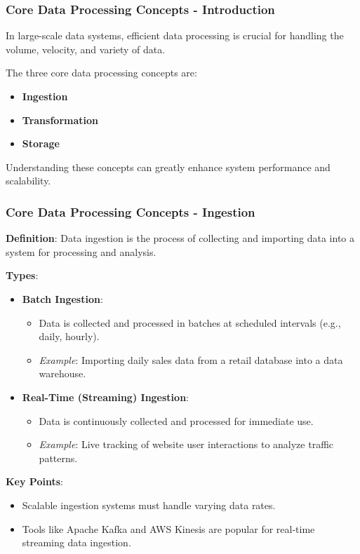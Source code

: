 \documentclass[aspectratio=169]{beamer}
\begin{document}
\begin{frame}[fragile]
    \frametitle{Core Data Processing Concepts - Introduction}
    In large-scale data systems, efficient data processing is crucial for handling the volume, velocity, and variety of data. 
    
    The three core data processing concepts are:
    \begin{itemize}
        \item \textbf{Ingestion}
        \item \textbf{Transformation}
        \item \textbf{Storage}
    \end{itemize}
    
    Understanding these concepts can greatly enhance system performance and scalability.
\end{frame}

\begin{frame}[fragile]
    \frametitle{Core Data Processing Concepts - Ingestion}
    \textbf{Definition}: Data ingestion is the process of collecting and importing data into a system for processing and analysis.
    
    \textbf{Types}:
    \begin{itemize}
        \item \textbf{Batch Ingestion}:
        \begin{itemize}
            \item Data is collected and processed in batches at scheduled intervals (e.g., daily, hourly).
            \item \textit{Example}: Importing daily sales data from a retail database into a data warehouse.
        \end{itemize}
        
        \item \textbf{Real-Time (Streaming) Ingestion}:
        \begin{itemize}
            \item Data is continuously collected and processed for immediate use.
            \item \textit{Example}: Live tracking of website user interactions to analyze traffic patterns.
        \end{itemize}
    \end{itemize}

    \textbf{Key Points}:
    \begin{itemize}
        \item Scalable ingestion systems must handle varying data rates.
        \item Tools like Apache Kafka and AWS Kinesis are popular for real-time streaming data ingestion.
    \end{itemize}
\end{frame}
\end{document}

